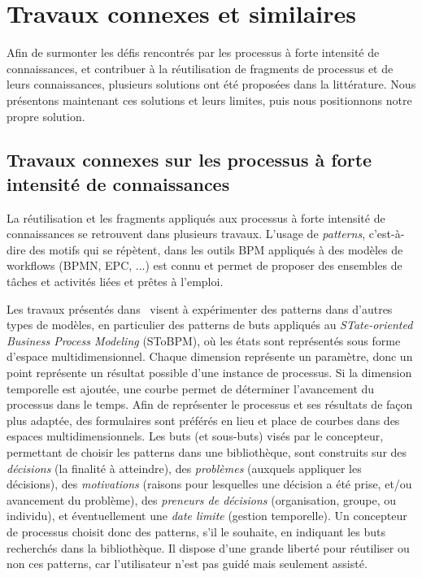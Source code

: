 \section{Travaux connexes et similaires}
\label{section:Contexte:TravauxConnexes}

Afin de surmonter les défis rencontrés par les processus à forte intensité de connaissances, et contribuer à la réutilisation de fragments de processus et de leurs connaissances, plusieurs solutions ont été proposées dans la littérature.
Nous présentons maintenant ces solutions et leurs limites, puis nous positionnons notre propre solution.

\bigskip

\subsection{Travaux connexes sur les processus à forte intensité de connaissances}
\label{section:Contexte:TravauxConnexes:KIP}

La réutilisation et les fragments appliqués aux processus à forte intensité de connaissances se retrouvent dans plusieurs travaux.
L'usage de \textit{patterns}, c'est-à-dire des motifs qui se répètent, dans les outils BPM appliqués à des modèles de workflows (BPMN, EPC, ...) est connu et permet de proposer des ensembles de tâches et activités liées et prêtes à l'emploi.

Les travaux présentés dans~\cite{bider2018introducing} visent à expérimenter des patterns dans d'autres types de modèles, en particulier des patterns de buts appliqués au \textit{STate-oriented Business Process Modeling} (SToBPM), où les états sont représentés sous forme d'espace multidimensionnel.
Chaque dimension représente un paramètre, donc un point représente un résultat possible d'une instance de processus.
Si la dimension temporelle est ajoutée, une courbe permet de déterminer l'avancement du processus dans le temps.
Afin de représenter le processus et ses résultats de façon plus adaptée, des formulaires sont préférés en lieu et place de courbes dans des espaces multidimensionnels.
Les buts (et sous-buts) visés par le concepteur, permettant de choisir les patterns dans une bibliothèque, sont construits sur des \textit{décisions} (la finalité à atteindre), des \textit{problèmes} (auxquels appliquer les décisions), des \textit{motivations} (raisons pour lesquelles une décision a été prise, et/ou avancement du problème), des \textit{preneurs de décisions} (organisation, groupe, ou individu), et éventuellement une \textit{date limite} (gestion temporelle).
Un concepteur de processus choisit donc des patterns, s'il le souhaite, en indiquant les buts recherchés dans la bibliothèque.
Il dispose d'une grande liberté pour réutiliser ou non ces patterns, car l'utilisateur n'est pas guidé mais seulement assisté.

